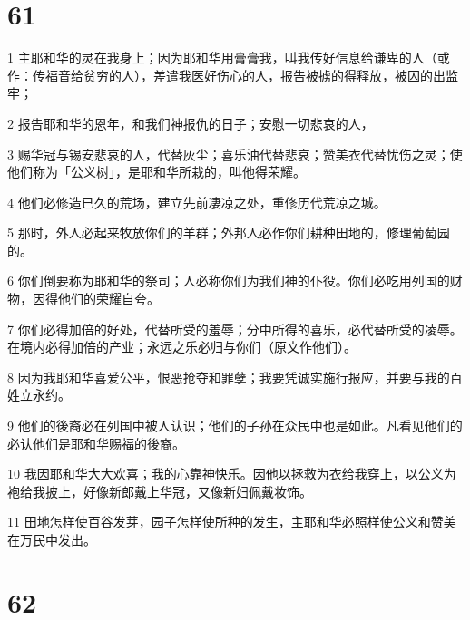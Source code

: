 \chapter{61}

\par 1 主耶和华的灵在我身上；因为耶和华用膏膏我，叫我传好信息给谦卑的人（或作：传福音给贫穷的人），差遣我医好伤心的人，报告被掳的得释放，被囚的出监牢；
\par 2 报告耶和华的恩年，和我们神报仇的日子；安慰一切悲哀的人，
\par 3 赐华冠与锡安悲哀的人，代替灰尘；喜乐油代替悲哀；赞美衣代替忧伤之灵；使他们称为「公义树」，是耶和华所栽的，叫他得荣耀。
\par 4 他们必修造已久的荒场，建立先前凄凉之处，重修历代荒凉之城。
\par 5 那时，外人必起来牧放你们的羊群；外邦人必作你们耕种田地的，修理葡萄园的。
\par 6 你们倒要称为耶和华的祭司；人必称你们为我们神的仆役。你们必吃用列国的财物，因得他们的荣耀自夸。
\par 7 你们必得加倍的好处，代替所受的羞辱；分中所得的喜乐，必代替所受的凌辱。在境内必得加倍的产业；永远之乐必归与你们（原文作他们）。
\par 8 因为我耶和华喜爱公平，恨恶抢夺和罪孽；我要凭诚实施行报应，并要与我的百姓立永约。
\par 9 他们的後裔必在列国中被人认识；他们的子孙在众民中也是如此。凡看见他们的必认他们是耶和华赐福的後裔。
\par 10 我因耶和华大大欢喜；我的心靠神快乐。因他以拯救为衣给我穿上，以公义为袍给我披上，好像新郎戴上华冠，又像新妇佩戴妆饰。
\par 11 田地怎样使百谷发芽，园子怎样使所种的发生，主耶和华必照样使公义和赞美在万民中发出。

\chapter{62}

